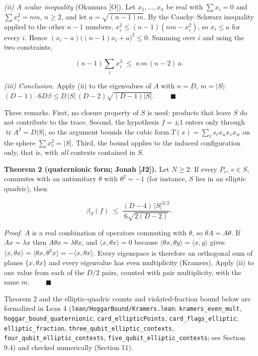 \documentclass[11pt,a4paper]{article}
\begin{document}
\emph{(ii) A scalar inequality} (Okumura {[}O{]}). Let \(x_1, \dots, x_n\) be real with \(\sum x_i = 0\) and
\(\sum x_i^2 = n m\), \(n \ge 2\), and let \(a = \sqrt{(n-1)m}\). By the Cauchy--Schwarz inequality applied to
the other \(n-1\) numbers, \(x_i^2 \le (n-1)(nm - x_i^2)\), so \(x_i \le a\) for every \(i\). Hence
\((x_i - a)\big((n-1)x_i + a\big)^2 \le 0\). Summing over \(i\) and using the two constraints,

\[(n-1) \sum_i x_i^3 \;\le\; n\, m\, (n-2)\, a .\]

\emph{(iii) Conclusion.} Apply (ii) to the eigenvalues of \(A\) with \(n = D\), \(m = |S|\):
\((D-1) \cdot 6 D \beta \le D\,|S|\,(D-2)\sqrt{(D-1)|S|}\). \(\qquad\blacksquare\)

Three remarks. First, no closure property of \(S\) is used: products that leave \(S\) do not contribute to
the trace. Second, the hypothesis \(f = \pm 1\) enters only through \(\operatorname{tr} A^2 = D|S|\), so the
argument bounds the cubic form \(T(x) = \sum_\ell s_\ell x_u x_v x_w\) on the sphere \(\sum x_v^2 = |S|\).
Third, the bound applies to the induced configuration only, that is, with \emph{all} contexts contained
in \(S\).

\textbf{Theorem 2 (quaternionic form; Jonah {[}J2{]}).} Let \(N\ge2\). If every \(P_v\), \(v \in S\), commutes with an
antiunitary \(\theta\) with \(\theta^2 = -1\) (for instance, \(S\) lies in an elliptic quadric), then

\[\beta_S(f) \;\le\; \frac{(D-4)\,|S|^{3/2}}{6\sqrt{2(D-2)}} .\]

\emph{Proof.} \(A\) is a real combination of operators commuting with \(\theta\), so \(\theta A = A \theta\). If
\(A x = \lambda x\) then \(A\theta x = \lambda \theta x\), and \(\langle x, \theta x\rangle = 0\) because
\(\langle \theta x, \theta y\rangle = \overline{\langle x, y \rangle}\) gives
\(\langle x, \theta x\rangle = \overline{\langle \theta x, \theta^2 x\rangle} = -\langle x, \theta x\rangle\).
Every eigenspace is therefore an orthogonal sum of planes \(\{x, \theta x\}\) and every eigenvalue has even
multiplicity (Kramers). Apply (ii) to one value from each of the \(D/2\) pairs, counted with pair
multiplicity, with the same \(m\).
\(\qquad\blacksquare\)

Theorem 2 and the elliptic-quadric counts and violated-fraction bound below are formalized in Lean 4
(\nolinkurl{lean/HoggarBound/Kramers.lean}: \texttt{kramers\_even\_mult}, \nolinkurl{hoggar_bound_quaternionic},
\nolinkurl{card_ellipticPoints}, \nolinkurl{card_flags_elliptic}, \texttt{elliptic\_fraction}, \nolinkurl{three_qubit_elliptic_contexts},
\nolinkurl{four_qubit_elliptic_contexts}, \nolinkurl{five_qubit_elliptic_contexts}; see Section 9.4) and checked
numerically (Section 11).
\end{document}
